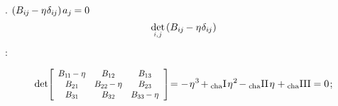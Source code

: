 \en{,}
.
${ ( B_{i\hspace{-0.1ex}j} \hspace{-0.15ex}
- \eta\hspace{.1ex} \delta_{i\hspace{-0.1ex}j} )
\hspace{.25ex} a_j \hspace{-0.1ex}
= 0 }$
\ru{,}
\begin{equation*}
\determinantby{i}{\hspace{.15ex}j}
\hspace{.3ex}
( \somebivalenttensorcomponents{i\hspace{-0.1ex}j} \hspace{-0.15ex} - \eigenvalue \delta_{ i \hspace{-0.1ex} j } )
\end{equation*}
:

\nopagebreak\vspace{-0.1em}
\begin{equation}\label{chardetequation}
\determinant \hspace{-0.4ex}
\scalebox{.85}[.88]{$
   \left[
      \begin{array}{ccc}
         \somebivalenttensorcomponents{1\hspace{-0.1ex}1} \hspace{-0.16ex} - \eigenvalue & \somebivalenttensorcomponents{12} & \somebivalenttensorcomponents{13} \\
         \somebivalenttensorcomponents{21} & \somebivalenttensorcomponents{22} \hspace{-0.16ex} - \eigenvalue & \somebivalenttensorcomponents{23} \\
         \somebivalenttensorcomponents{31} & \somebivalenttensorcomponents{32} & \somebivalenttensorcomponents{33} \hspace{-0.16ex} - \eigenvalue
      \end{array}
   \hspace{.1ex}
   \right]
$} %
\hspace{-0.4ex} = - \hspace{.2ex}
\eigenvalue^3 \hspace{-0.25ex}
+ \firstcharacteristicinvariant \hspace{.25ex}
\eigenvalue^2 \hspace{-0.25ex}
- \secondcharacteristicinvariant \hspace{.25ex}
\eigenvalue
+ \thirdcharacteristicinvariant
= 0
\hspace{.2ex} ;
\end{equation}

